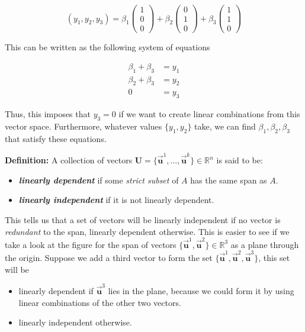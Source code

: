 \documentclass[11pt]{article}
\begin{document}
\[
(y_1, y_2, y_3) = \beta_1 \begin{pmatrix} 1 \\ 0 \\ 0 \end{pmatrix} + \beta_2 \begin{pmatrix} 0 \\ 1 \\ 0 \end{pmatrix} + \beta_3 \begin{pmatrix} 1 \\ 1 \\ 0 \end{pmatrix}
\]

This can be written as the following system of equations

\[
\begin{align*}
\beta_1 + \beta_3 &= y_1 \\
\beta_2 + \beta_3 &= y_2 \\
0 &= y_3
\end{align*}
\]

Thus, this imposes that \(y_3 = 0\) if we want to create linear
combinations from this vector space. Furthermore, whatever values
\(\{y_1, y_2\}\) take, we can find \(\beta_1, \beta_2, \beta_3\) that
satisfy these equations.

    \textbf{Definition:} A collection of vectors
\(\mathbf{U} = \{\vec{\mathbf{u}}^1, \ldots, \vec{\mathbf{u}}^k\}\in\mathbb{R}^n\)
is said to be:

\begin{itemize}
\item
  \textbf{\emph{linearly dependent}} if some \emph{strict subset} of
  \(A\) has the same span as \(A\).
\item
  \textbf{\emph{linearly independent}} if it is not linearly dependent.
\end{itemize}

This tells us that a set of vectors will be linearly independent if no
vector is \emph{redundant} to the span, linearly dependent otherwise.
This is easier to see if we take a look at the figure for the span of
vectors \(\{\vec{\mathbf{u}}^1, \vec{\mathbf{u}}^2\}\in\mathbb{R}^3\) as
a plane through the origin. Suppose we add a third vector to form the
set \(\{\vec{\mathbf{u}}^1, \vec{\mathbf{u}}^2, \vec{\mathbf{u}}^3\}\),
this set will be

\begin{itemize}
\item
  linearly dependent if \(\vec{\mathbf{u}}^3\) lies in the plane,
  because we could form it by using linear combinations of the other two
  vectors.
\item
  linearly independent otherwise.
\end{itemize}
\end{document}
